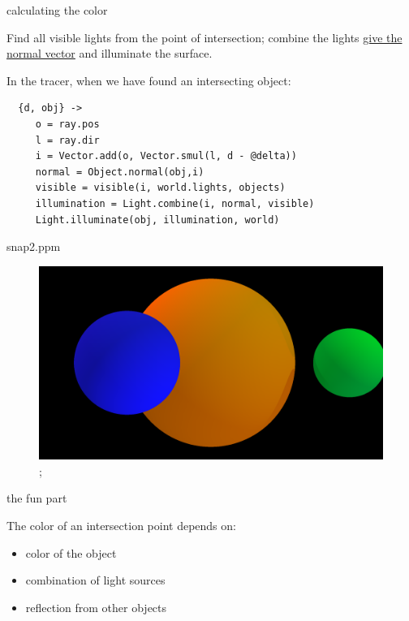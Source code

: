 \begin{frame}[fragile]{calculating the color}

  Find all visible lights from the point of intersection; combine the
  lights \underline{give the normal vector} and illuminate the
  surface.  \pause

  In the tracer, when we have found an intersecting object:

\begin{verbatim}
  {d, obj} ->
     o = ray.pos
     l = ray.dir
     i = Vector.add(o, Vector.smul(l, d - @delta))
     normal = Object.normal(obj,i)
     visible = visible(i, world.lights, objects)
     illumination = Light.combine(i, normal, visible)
     Light.illuminate(obj, illumination, world)
 \end{verbatim}

\end{frame}


\begin{frame}{snap2.ppm}

\begin{figure}
\includegraphics[scale=0.2]{snap2.png};
\end{figure}

\end{frame}

\begin{frame}{the fun part}

The color of an intersection point depends on:

\begin{itemize}
 \pause \item color of the object
 \pause \item combination of light sources 
 \pause \item reflection from other objects
\end{itemize}

\end{frame}


